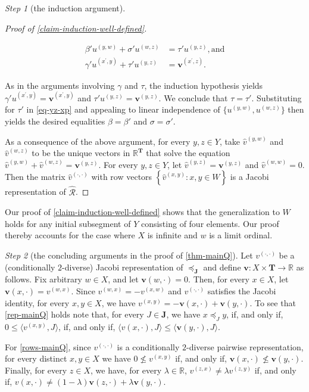 \documentclass[ecta,nameyear,draft]{econsocart}
\newcommand{\R}{\mathbb R}
\newcommand{\hext}{\mathrel{\hat{\mathrel{\mathcal R}}}}
\newcommand{\mbbt}{{\mathbf {T}}}
\newcommand{\mbbj}{\mathbf J}
\newcommand{\xy}{{(x, y)}}
\newcommand{\yz}{{(y,z)}}
\newcommand{\zy}{{(z,y)}}
\newcommand{\zx}{{(z,x)}}
\newcommand{\xw}{{(x,w)}}
\newcommand{\wx}{{(w,x)}}
\newcommand{\yw}{{(y,w)}}
\newcommand{\wz}{(w,z)}
\newcommand{\xpy}{(x^{\prime},y)}
\newcommand{\xpz}{(x^{\prime},z)}
\newcommand{\dd}{{(\cdot,\cdot)}}
\renewcommand{\v}{{\mathbf{v}}}
\theoremstyle{plain}
\theoremstyle{remark}
\newtheorem{step}{Step}[section]
\begin{document}
\begin{appendix}
\begin{step}[the induction argument]
\begin{proofEnd}
\begin{proof}[Proof of \cref{claim-induction-well-defined}]
\begin{linenomath*}
\begin{align}
      \label{eq-yz-xp}
      \beta' u^{\yw} + \sigma' u^{\wz}& = \tau' u^{\yz}, \text{and}\\
      \label{eq-xpz-y}
      \gamma' u^{\xpy} + \tau' u^{\yz} &= \v^{\xpz}.
   \end{align}
  \end{linenomath*}
  \addtocounter{linenumber}{-1} As in the arguments involving $\gamma$ and
  $\tau$, the induction hypothesis yields
  $\gamma ' u^{\xpy} = \v^{\xpy}$ and $\tau ' u^{\yz} = \v^{\yz}$.
  We conclude that $\tau = \tau'$.  Substituting for $\tau'$ in \cref{eq-yz-xp}
  and appealing to linear independence of $\{u^{\yw}, u^{\wz}\}$ then yields the
  desired equalities $\beta = \beta'$ and $\sigma = \sigma '$.
    
    As a consequence of the above argument, for every $y , z \in Y$, take
    $\hat{v}^{\yw}$ and $\hat{v}^{\wz}$ to be the unique vectors in $\R^{\mbbt}$
    that solve the equation $\hat{v}^{\yw} + \hat{v}^{\wz} = \v^{\yz}$.
    For every $y , z \in Y$, let $\hat{v}^{\yz} = \v^{\yz}$ and $\hat{v}^{(w,w)}
    = 0$.  Then the matrix $\hat{v}^{\dd}$ with row vectors $\left\{
      \hat{v}^{\xy}: x , y \in W \right\}$ is a Jacobi representation of $\hext$.
  \end{proof}
  Our proof of \cref{claim-induction-well-defined} shows that the
  generalization to $W$ holds for any initial subsegment of $Y$ consisting of
  four elements. Our proof thereby accounts for the case where $X$ is infinite
  and $w$ is a limit ordinal.
  \end{proofEnd}
  \end{step}
  
  \begin{step}[the concluding arguments in the proof of \cref{thm-mainQ}]
    \label{step-conc-mainQ}
    Let $v^{\dd}$ be a (conditionally $2$-diverse) Jacobi representation of
    $\preceq_{\mbbj}$ and define $\mathbf{v}: X\times \mbbt \rightarrow \R$ as
    follows. Fix arbitrary $w\in X$, and let $\mathbf{v}(w,\cdot) = 0$. Then,
    for every $x\in X$, let $\mathbf{v}(x,\cdot) = v^{\wx}$. Since $v^{\wx}=
    -v^{\xw}$ and $v^{\dd}$ satisfies the Jacobi identity, for every $x,y\in
    X$, we have $v^{\xy} =  -\mathbf{v}(x,\cdot) + \mathbf{v}(y,\cdot)$. To see
    that \ref{rep-mainQ} holds note that, for every $J\in \mbbj$, we have $x
    \preceq_{J} y$, if, and only if, $0 \leq
    \langle v^{\xy}, J \rangle$, if, and only if, $\langle v(x,\cdot),
    J \rangle \leq \langle \mathbf{v}(y,\cdot), J \rangle$.

    For \ref{rows-mainQ}, since $v^{\dd}$ is a conditionally $2$-diverse
    pairwise representation, for every distinct $x,y\in X$ we have $0 \not \leq
    v^{\xy}$ if, and only if, $\mathbf{v}(x,\cdot) \not \leq 
    \mathbf{v}(y,\cdot)$. Finally, for every $z\in X$, we have, for every
    $\lambda \in \R$, $v^{\zx} \neq \lambda v^{\zy}$ if, and only if,
    $v(x,\cdot) \neq (1-\lambda) \mathbf{v}(z,\cdot ) + \lambda
    \mathbf{v}(y,\cdot)$.


\end{step}
\end{appendix}
\end{document}
